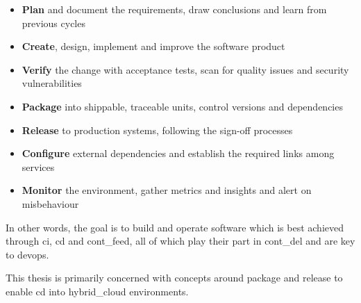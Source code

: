 \documentclass[../main.tex]{subfiles}
\begin{document}
    \begin{itemize}
        \setlength\itemsep{0em}
        \item \textbf{Plan} and document the requirements, draw conclusions and learn from previous cycles
        \item \textbf{Create}, design, implement and improve the software product
        \item \textbf{Verify} the change with acceptance tests, scan for quality issues and security vulnerabilities
        \item \textbf{Package} into shippable, traceable units, control versions and dependencies
        \item \textbf{Release} to production systems, following the sign-off processes
        \item \textbf{Configure} external dependencies and establish the required links among services
        \item \textbf{Monitor} the environment, gather metrics and insights and alert on misbehaviour
    \end{itemize}

    In other words, the goal is to build and operate software which is best achieved through \acrfull{ci}, \acrfull{cd} and \gls{cont_feed}, all of which play their part in \gls{cont_del} and are key to \gls{devops}.

    This thesis is primarily concerned with concepts around package and release to enable \acrlong{cd} into \gls{hybrid_cloud} environments.
\end{document}
